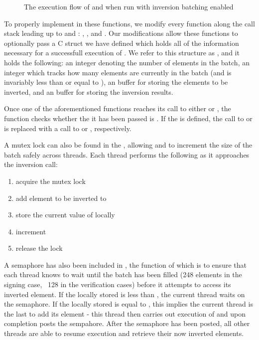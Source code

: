 \begin{figure}[!h]
\begin{tikzpicture}
\end{tikzpicture}
\caption{The execution flow of  and  when run with inversion batching enabled}
\end{figure}

To properly implement  in these functions, we modify every function along the call stack leading up to  and : , , and . Our modifications allow these functions to optionally pass a C struct we have defined which holds all of the information necessary for a successfull execution of . We refer to this structure as , and it holds the following: an integer  denoting the number of elements in the batch, an integer  which tracks how many elements are currently in the batch (and is invariably less than or equal to ), an  buffer  for storing the elements to be inverted, and an  buffer  for storing the inversion results.

Once one of the aforementioned  functions reaches its call to either  or , the function checks whether the  it has been passed is . If the  is defined, the call to  or  is replaced with a call to  or , respectively.

A mutex lock can also be found in the , allowing  and  to increment the size of the batch safely across threads. Each thread performs the following as it approaches the inversion call:
\begin{enumerate}
\item acquire the mutex lock
\item add element to be inverted to 
\item store the current value of  locally
\item increment 
\item release the lock
\end{enumerate}

A semaphore has also been included in , the function of which is to ensure that each thread knows to wait until the batch has been filled (248 elements in the signing case, ~128 in the verification cases) before it attempts to access its inverted element. If the locally stored  is less than , the current thread waits on the semaphore. If the locally stored  is equal to , this implies the current thread is the last to add its element - this thread then carries out execution of  and upon completion posts the sempahore. After the semaphore has been posted, all other threads are able to resume execution and retrieve their now inverted elements.\\

